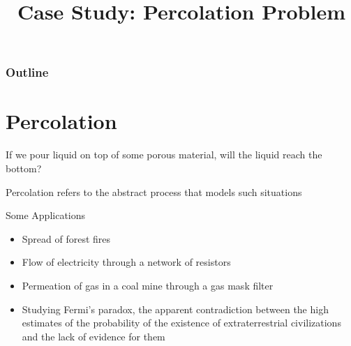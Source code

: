 \documentclass[8pt,a4paper,compress]{beamer}
\title{Case Study: Percolation Problem}
\date{}
\begin{document}
\begin{frame}
\vfill
\titlepage
\end{frame}

\begin{frame}
\frametitle{Outline}
\tableofcontents
\end{frame}

\section{Percolation}
\begin{frame}[fragile]
\pause

If we pour liquid on top of some porous material, will the liquid reach the bottom? 

\pause
\bigskip

Percolation refers to the abstract process that models such situations

\pause
\bigskip

Some Applications
\begin{itemize}
\item Spread of forest fires
\item Flow of electricity through a network of resistors
\item Permeation of gas in a coal mine through a gas mask filter
\item Studying Fermi's paradox, the apparent contradiction between the high estimates of the probability of the existence of extraterrestrial civilizations and the lack of evidence for them
\end{itemize}
\end{frame}
\end{document}

